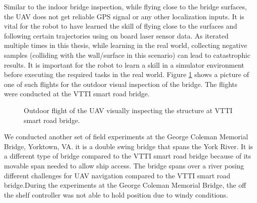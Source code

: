\documentclass[12pt]{report}
\begin{document}
Similar to the indoor bridge inspection, while flying close to the bridge surfaces, the UAV does not get reliable GPS signal or any other localization inputs. It is vital for the robot to have learned the skill of flying close to the surfaces and following certain trajectories using on board laser sensor data. As iterated multiple times in this thesis, while learning in the real world, collecting negative samples (colliding with the wall/surface in this scenario) can lead to catastrophic results. It is important for the robot to learn a skill in a simulator environment before executing the required tasks in the real world.
Figure \ref{fig:outdoor_flight} shows a picture of one of such flights for the outdoor visual inspection of the bridge. The flights were conducted at the VTTI smart road bridge.
\begin{figure}[htp]
	\centering 
	\caption{Outdoor flight of the UAV visually inspecting the structure at VTTI smart road bridge.}
   \label{fig:outdoor_flight}
\end{figure}

We conducted another set of field experiments at the George Coleman Memorial Bridge, Yorktown, VA. it is a double swing bridge that spans the York River. It is a different type of bridge compared to the VTTI smart road bridge because of its movable span needed to allow ship access. The bridge spans over a river posing different challenges for UAV navigation compared to the VTTI smart road bridge.During the experiments at the George Coleman Memorial Bridge, the off the shelf controller was not able to hold position due to windy conditions. 
\end{document}
